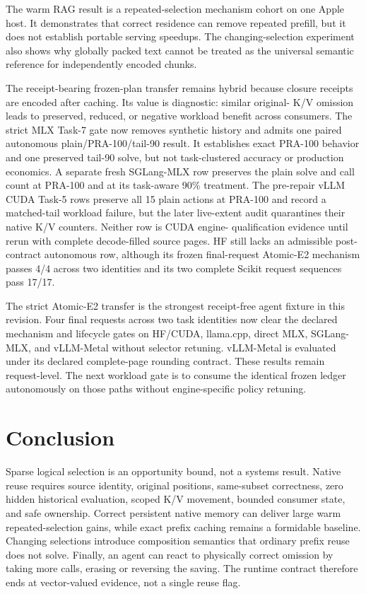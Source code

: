 \documentclass[11pt]{article}
\begin{document}
The warm RAG result is a repeated-selection mechanism cohort on one Apple host.
It demonstrates that correct residence can remove repeated prefill, but it does
not establish portable serving speedups.  The changing-selection experiment
also shows why globally packed text cannot be treated as the universal semantic
reference for independently encoded chunks.

The receipt-bearing frozen-plan transfer remains hybrid because closure
receipts are encoded after caching.  Its value is diagnostic: similar original-
K/V omission leads to preserved, reduced, or negative workload benefit across
consumers.  The strict MLX Task-7 gate now removes synthetic history and admits
one paired autonomous plain/PRA-100/tail-90 result.  It establishes exact
PRA-100 behavior and one preserved tail-90 solve, but not task-clustered
accuracy or production economics.  A separate fresh SGLang-MLX row preserves
the plain solve and call count at PRA-100 and at its task-aware 90\% treatment.
The pre-repair vLLM CUDA Task-5 rows preserve all 15 plain actions at PRA-100
and record a matched-tail workload failure, but the later live-extent audit
quarantines their native K/V counters.  Neither row is CUDA engine-
qualification evidence until rerun with complete decode-filled source pages.
HF still lacks an admissible post-contract autonomous row, although its frozen
final-request Atomic-E2 mechanism passes 4/4 across two identities and its two
complete Scikit request sequences pass 17/17.

The strict Atomic-E2 transfer is the strongest receipt-free agent fixture in
this revision.  Four final requests across two task identities now clear the
declared mechanism and lifecycle gates on HF/CUDA, llama.cpp, direct MLX,
SGLang-MLX, and vLLM-Metal without selector retuning.  vLLM-Metal is evaluated under its declared complete-page rounding
contract.  These results remain request-level.
The next workload gate is to
consume the identical frozen ledger autonomously on those paths without
engine-specific policy retuning.

\section{Conclusion}

Sparse logical selection is an opportunity bound, not a systems result.  Native
reuse requires source identity, original positions, same-subset correctness,
zero hidden historical evaluation, scoped K/V movement, bounded consumer state,
and safe ownership.  Correct persistent native memory can deliver large warm
repeated-selection gains, while exact prefix caching remains a formidable
baseline.  Changing selections introduce composition semantics that ordinary
prefix reuse does not solve.  Finally, an agent can react to physically correct
omission by taking more calls, erasing or reversing the saving.  The runtime
contract therefore ends at vector-valued evidence, not a single reuse flag.
\end{document}
